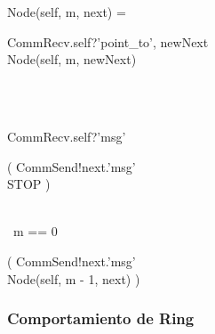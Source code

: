 \begin{process}
Node(self, m, next) = \\ \quad
  \begin{block}
  CommRecv.self?\langle 'point\_to', newNext \rangle \then \\
  Node(self, m, newNext)
  \end{block} \\

  \Extchoice \\ \quad
  
  \begin{block}
  CommRecv.self?\langle 'msg' \rangle \then {} \\ \quad
    \begin{block} \quad
      \begin{block} 
      ( CommSend!next.\langle 'msg' \rangle \then \\
      STOP )
      \end{block} \\
         {} \lceil\ m == 0\ \rceil  \\ \quad
      \begin{block}
      ( CommSend!next.\langle 'msg' \rangle \then \\
      Node(self, m - 1, next) ) 
      \end{block}
    \end{block}
  \end{block} 
\end{process}

% 

\subsubsection*{Comportamiento de Ring}

